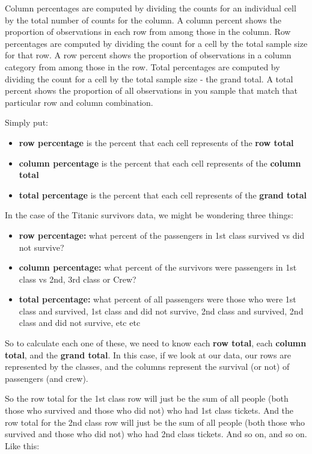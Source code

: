 \documentclass[
]{book}
\providecommand{\tightlist}{%
  \setlength{\itemsep}{0pt}\setlength{\parskip}{0pt}}
\begin{document}
Column percentages are computed by dividing the counts for an individual cell by the total number of counts for the column. A column percent shows the proportion of observations in each row from among those in the column. Row percentages are computed by dividing the count for a cell by the total sample size for that row. A row percent shows the proportion of observations in a column category from among those in the row. Total percentages are computed by dividing the count for a cell by the total sample size - the grand total. A total percent shows the proportion of all observations in you sample that match that particular row and column combination.

Simply put:

\begin{itemize}
\tightlist
\item
  \textbf{row percentage} is the percent that each cell represents of the \textbf{row total}
\item
  \textbf{column percentage} is the percent that each cell represents of the \textbf{column total}
\item
  \textbf{total percentage} is the percent that each cell represents of the \textbf{grand total}
\end{itemize}

In the case of the Titanic survivors data, we might be wondering three things:

\begin{itemize}
\tightlist
\item
  \textbf{row percentage:} what percent of the passengers in 1st class survived vs did not survive?
\item
  \textbf{column percentage:} what percent of the survivors were passengers in 1st class vs 2nd, 3rd class or Crew?
\item
  \textbf{total percentage:} what percent of all passengers were those who were 1st class and survived, 1st class and did not survive, 2nd class and survived, 2nd class and did not survive, etc etc
\end{itemize}

So to calculate each one of these, we need to know each \textbf{row total}, each \textbf{column total}, and the \textbf{grand total}. In this case, if we look at our data, our rows are represented by the classes, and the columns represent the survival (or not) of passengers (and crew).

So the row total for the 1st class row will just be the sum of all people (both those who survived and those who did not) who had 1st class tickets. And the row total for the 2nd class row will just be the sum of all people (both those who survived and those who did not) who had 2nd class tickets. And so on, and so on. Like this:
\end{document}
